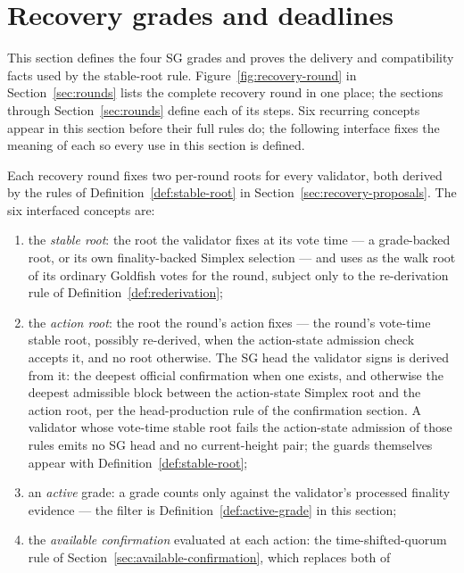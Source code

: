 \section{Recovery grades and deadlines}\label{sec:grades}

This section defines the four SG grades and proves the delivery and
compatibility facts used by the stable-root rule.
Figure~\ref{fig:recovery-round} in Section~\ref{sec:rounds} lists the
complete recovery round in one place; the sections through
Section~\ref{sec:rounds} define each of its steps.  Six recurring
concepts appear in this section before their full rules do; the
following interface fixes the meaning of each so every use in this
section is defined.

\begin{definition}
\label{def:root-interface}
Each recovery round fixes two per-round roots for every validator, both
derived by the rules of Definition~\ref{def:stable-root} in
Section~\ref{sec:recovery-proposals}.  The six interfaced concepts are:
\begin{enumerate}
 \item the \emph{stable root}: the root the validator fixes at its
   vote time --- a grade-backed root, or its own finality-backed
   Simplex selection --- and uses as the walk root of its ordinary
   Goldfish votes for the round, subject only to the re-derivation rule
   of Definition~\ref{def:rederivation};
 \item the \emph{action root}: the root the round's action fixes ---
   the round's vote-time stable root, possibly re-derived, when the
   action-state admission check accepts it, and no root otherwise.  The
   SG head the validator signs is derived from it: the deepest official
   confirmation when one exists, and otherwise the deepest admissible
   block between the action-state Simplex root and the action root, per
   the head-production rule of the confirmation section.  A validator
   whose vote-time stable root fails the action-state admission of
   those rules emits no SG head and no current-height pair; the guards
   themselves appear with Definition~\ref{def:stable-root};
 \item an \emph{active} grade: a grade counts only against the
   validator's processed finality evidence --- the filter is
   Definition~\ref{def:active-grade} in this section;
 \item the \emph{available confirmation} evaluated at each action:
   the time-shifted-quorum rule of
   Section~\ref{sec:available-confirmation}, which replaces both of

\end{enumerate}
\end{definition}
